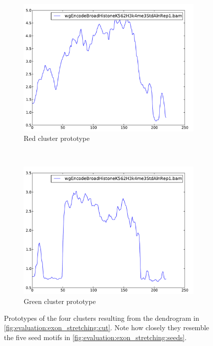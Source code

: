 \documentclass[parskip]{cs4rep}
\begin{document}
\begin{figure}[t,b]
    ~
    \begin{subfigure}[b]{0.22\textwidth}
        \includegraphics[width=\textwidth]{figures/evaluation/exon_stretching/cluster-4.pdf}
        \caption{Red cluster prototype}
        \label{fig:evaluation:exon_stretching:clusters:3:prototype}
    \end{subfigure}
    ~
    \begin{subfigure}[b]{0.22\textwidth}
        \includegraphics[width=\textwidth]{figures/evaluation/exon_stretching/cluster-3.pdf}
        \caption{Green cluster prototype}
        \label{fig:evaluation:exon_stretching:clusters:4:prototype}
    \end{subfigure}
    \caption{Prototypes of the four clusters resulting from the dendrogram in \autoref{fig:evaluation:exon_stretching:cut}. Note how closely they resemble the five seed motifs in \autoref{fig:evaluation:exon_stretching:seeds}.}
    \label{fig:evaluation:exon_stretching:clusters:prototypes}
\end{figure}
\end{document}
